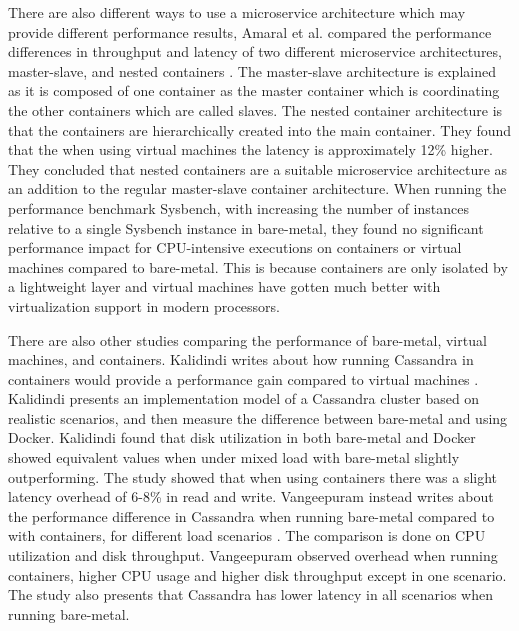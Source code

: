 \documentclass[a4paper,oneside]{bth}
\begin{document}
There are also different ways to use a microservice architecture which may provide different performance results, Amaral et al. compared the performance differences in throughput and latency of two different microservice architectures, master-slave, and nested containers \cite{Amaral}. The master-slave architecture is explained as it is composed of one container as the master container which is coordinating the other containers which are called slaves. The nested container architecture is that the containers are hierarchically created into the main container. They found that the when using virtual machines the latency is approximately 12\% higher. They concluded that nested containers are a suitable microservice architecture as an addition to the regular master-slave container architecture. When running the performance benchmark Sysbench, with increasing the number of instances relative to a single Sysbench instance in bare-metal, they found no significant performance impact for CPU-intensive executions on containers or virtual machines compared to bare-metal. This is because containers are only isolated by a lightweight layer and virtual machines have gotten much better with virtualization support in modern processors.

\par\vspace {0.5cm}

There are also other studies comparing the performance of bare-metal, virtual machines, and containers. Kalidindi writes about how running Cassandra in containers would provide a performance gain compared to virtual machines \cite{Kalidindi}. Kalidindi presents an implementation model of a Cassandra cluster based on realistic scenarios, and then measure the difference between bare-metal and using Docker. Kalidindi found that disk utilization in both bare-metal and Docker showed equivalent values when under mixed load with bare-metal slightly outperforming. The study showed that when using containers there was a slight latency overhead of 6-8\% in read and write. Vangeepuram instead writes about the performance difference in Cassandra when running bare-metal compared to with containers, for different load scenarios \cite{Vangeepuram}. The comparison is done on CPU utilization and disk throughput. Vangeepuram observed overhead when running containers, higher CPU usage and higher disk throughput except in one scenario. The study also presents that Cassandra has lower latency in all scenarios when running bare-metal. 

\par\vspace {0.5cm}
\end{document}
